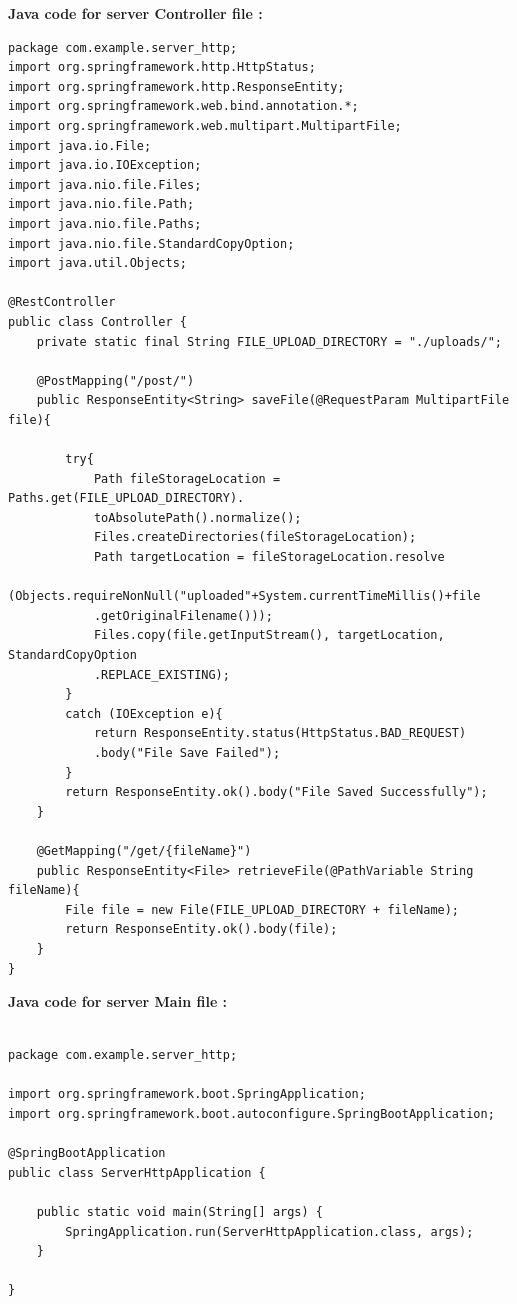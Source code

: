 \documentclass[11pt]{article}
\begin{document}
\vspace{.5cm}

\textbf{Java code for server Controller file : }\\[12pt]
\begin{verbatim}
package com.example.server_http;
import org.springframework.http.HttpStatus;
import org.springframework.http.ResponseEntity;
import org.springframework.web.bind.annotation.*;
import org.springframework.web.multipart.MultipartFile;
import java.io.File;
import java.io.IOException;
import java.nio.file.Files;
import java.nio.file.Path;
import java.nio.file.Paths;
import java.nio.file.StandardCopyOption;
import java.util.Objects;

@RestController
public class Controller {
    private static final String FILE_UPLOAD_DIRECTORY = "./uploads/";

    @PostMapping("/post/")
    public ResponseEntity<String> saveFile(@RequestParam MultipartFile file){

        try{
            Path fileStorageLocation = Paths.get(FILE_UPLOAD_DIRECTORY).
            toAbsolutePath().normalize();
            Files.createDirectories(fileStorageLocation);
            Path targetLocation = fileStorageLocation.resolve
            (Objects.requireNonNull("uploaded"+System.currentTimeMillis()+file
            .getOriginalFilename()));
            Files.copy(file.getInputStream(), targetLocation, StandardCopyOption
            .REPLACE_EXISTING);
        }
        catch (IOException e){
            return ResponseEntity.status(HttpStatus.BAD_REQUEST)
            .body("File Save Failed");
        }
        return ResponseEntity.ok().body("File Saved Successfully");
    }

    @GetMapping("/get/{fileName}")
    public ResponseEntity<File> retrieveFile(@PathVariable String fileName){
        File file = new File(FILE_UPLOAD_DIRECTORY + fileName);
        return ResponseEntity.ok().body(file);
    }
}
\end{verbatim}
\vspace{.5cm}
\textbf{Java code for server Main file : }\\[12pt]
\begin{verbatim}

package com.example.server_http;

import org.springframework.boot.SpringApplication;
import org.springframework.boot.autoconfigure.SpringBootApplication;

@SpringBootApplication
public class ServerHttpApplication {

    public static void main(String[] args) {
        SpringApplication.run(ServerHttpApplication.class, args);
    }

}
\end{verbatim}
\end{document}
